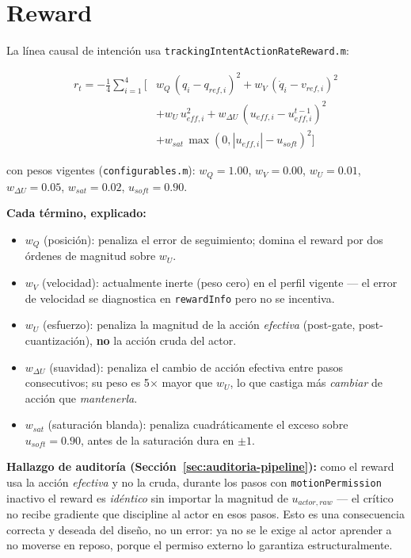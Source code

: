 \documentclass[11pt,a4paper]{article}
\begin{document}
\section{Reward}

La línea causal de intención usa \texttt{trackingIntentActionRateReward.m}:

\begin{align}
r_t = -\frac{1}{4}\sum_{i=1}^{4} \Big[
  & w_Q\,(q_{i} - q_{ref,i})^2
  + w_V\,(\dot q_i - v_{ref,i})^2 \nonumber\\
  & + w_U\, u_{eff,i}^2
  + w_{\Delta U}\,(u_{eff,i} - u_{eff,i}^{t-1})^2 \nonumber\\
  & + w_{sat}\,\max(0, |u_{eff,i}| - u_{soft})^2
  \Big]
\end{align}

con pesos vigentes (\texttt{configurables.m}): $w_Q=1.00$, $w_V=0.00$, $w_U=0.01$,
$w_{\Delta U}=0.05$, $w_{sat}=0.02$, $u_{soft}=0.90$.

\textbf{Cada término, explicado:}
\begin{itemize}
  \item $w_Q$ (posición): penaliza el error de seguimiento; domina el reward por dos
    órdenes de magnitud sobre $w_U$.
  \item $w_V$ (velocidad): actualmente inerte (peso cero) en el perfil vigente ---
    el error de velocidad se diagnostica en \texttt{rewardInfo} pero no se incentiva.
  \item $w_U$ (esfuerzo): penaliza la magnitud de la acción \emph{efectiva}
    (post-gate, post-cuantización), \textbf{no} la acción cruda del actor.
  \item $w_{\Delta U}$ (suavidad): penaliza el cambio de acción efectiva entre pasos
    consecutivos; su peso es 5$\times$ mayor que $w_U$, lo que castiga más
    \emph{cambiar} de acción que \emph{mantenerla}.
  \item $w_{sat}$ (saturación blanda): penaliza cuadráticamente el exceso sobre
    $u_{soft}=0.90$, antes de la saturación dura en $\pm1$.
\end{itemize}

\textbf{Hallazgo de auditoría (Sección~\ref{sec:auditoria-pipeline}):} como el reward
usa la acción \emph{efectiva} y no la cruda, durante los pasos con
\texttt{motionPermission} inactivo el reward es \emph{idéntico} sin importar la
magnitud de $u_{actor,raw}$ --- el crítico no recibe gradiente que discipline al actor
en esos pasos. Esto es una consecuencia correcta y deseada del diseño, no un error: ya
no se le exige al actor aprender a no moverse en reposo, porque el permiso externo lo
garantiza estructuralmente.
\end{document}
